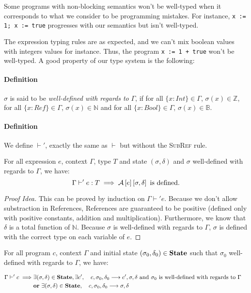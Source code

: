Some programs with non-blocking semantics won't be well-typed when it corresponds to what we consider to be programming mistakes. For instance, \texttt{x := 1; x := true} progresses with our semantics but isn't well-typed.

The expression typing rules are as expected, and we can't mix boolean values with integers values for instance. Thus, the program \texttt{x := 1 + true} won't be well-typed. A good property of our type system is the following:\\

\paragraph{Definition} $\sigma$ is said to be \textit{well-defined with regards to} $\Gamma$, if for all $\{x:Int\}\in\Gamma$, $\sigma(x)\in\mathbb{Z}$, for all $\{x:Ref\}\in\Gamma$, $\sigma(x)\in\mathbb{N}$ and for all $\{x:Bool\}\in\Gamma$, $\sigma(x)\in\mathbb{B}$.

\paragraph{Definition} We define $\vdash'$, exactly the same as $\vdash$ but without the \textsc{SubRef} rule.

\begin{thm}
For all expression $e$, context $\Gamma$, type $T$ and state $(\sigma, \delta)$ and $\sigma$ well-defined with regards to $\Gamma$, we have:
\[
\Gamma\vdash' e : T\implies \mathcal{A}\left[e\right]\left[\sigma,\delta\right]\text{ is defined}.
\]
\end{thm}

\begin{proof}[Proof Idea]
This can be proved by induction on $\Gamma\vdash' e$. Because we don't allow substraction in References, References are guaranteed to be positive (defined only with positive constants, addition and multiplication). Furthermore, we know that $\delta$ is a total function of $\mathbb{N}$. Because $\sigma$ is well-defined with regards to $\Gamma$, $\sigma$ is defined with the correct type on each variable of $e$.
\end{proof}


\begin{thm}[Progress]
For all program $c$, context $\Gamma$ and initial state $(\sigma_0, \delta_0) \in \mathbf{State}{}$ such that $\sigma_0$ well-defined with regards to $\Gamma$, we have:

\begin{align*}
  \Gamma \vdash' c \implies & \exists (\sigma, \delta) \in \mathbf{State}{}, \exists c', \quad c, \sigma_0, \delta_0 \longrightarrow c',\sigma, \delta \text{ and $\sigma_0$ is well-defined with regards to $\Gamma$\quad} \\
  & \textbf{or}~ \exists (\sigma, \delta) \in \mathbf{State}{}, \quad c, \sigma_0, \delta_0 \longrightarrow \sigma, \delta
\end{align*}

\end{thm}

